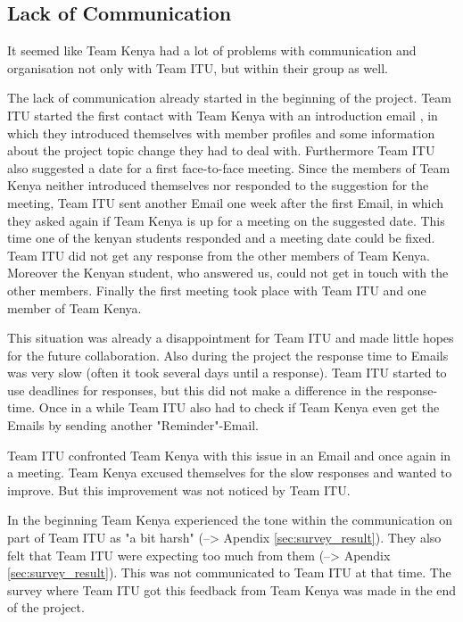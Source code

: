 
\subsection{Lack of Communication}
\label{sec:communication_lack}
It seemed like Team Kenya had a lot of problems with communication and organisation not only with Team ITU, but within their group as well.

The lack of communication already started in the beginning of the project. Team ITU started the first contact with Team Kenya with an introduction email , in which they introduced themselves with member profiles and some information about the project topic change they had to deal with. Furthermore Team ITU also suggested a date for a first face-to-face meeting. Since the members of Team Kenya neither introduced themselves nor responded to the suggestion for the meeting, Team ITU sent another Email one week after the first Email, in which they asked again if Team Kenya is up for a meeting on the suggested date. This time one of the kenyan students responded and a meeting date could be fixed. Team ITU did not get any response from the other members of Team Kenya. Moreover the Kenyan student, who answered us, could not get in touch with the other members. Finally the first meeting took place with Team ITU and one member of Team Kenya.

This situation was already a disappointment for Team ITU and made little hopes for the future collaboration. Also during the project the response time to Emails was very slow (often it took several days until a response). Team ITU started to use deadlines for responses, but this did not make a difference in the response-time. Once in a while Team ITU also had to check if Team Kenya even get the Emails by sending another "Reminder"-Email.

Team ITU confronted Team Kenya with this issue in an Email and once again in a meeting. Team Kenya excused themselves for the slow responses and wanted to improve. But this improvement was not noticed by Team ITU.

In the beginning Team Kenya experienced the tone within the communication on part of Team ITU  as "a bit harsh" (--> Apendix \ref{sec:survey_result}). They also felt that Team ITU were expecting too much from them (--> Apendix \ref{sec:survey_result}). This was not communicated to Team ITU at that time. The survey where Team ITU got this feedback from Team Kenya was made in the end of the project. 

